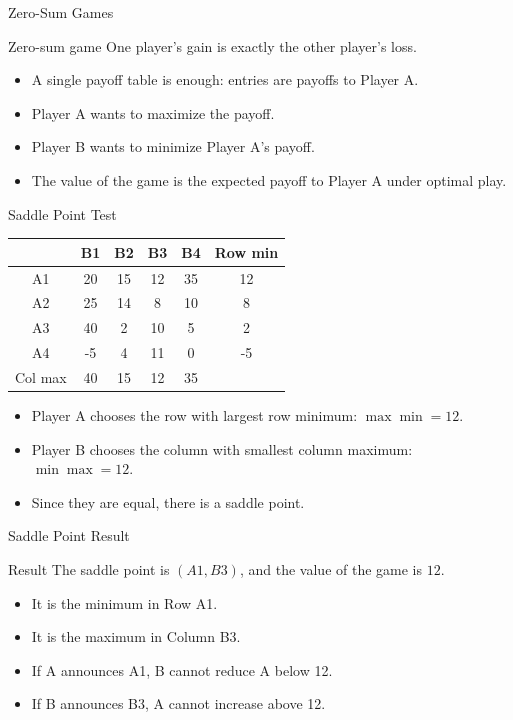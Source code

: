 \documentclass[10pt,aspectratio=169]{beamer}
\begin{document}
\begin{frame}{Zero-Sum Games}
\begin{block}{Zero-sum game}
One player's gain is exactly the other player's loss.
\end{block}
\vspace{0.2cm}
\begin{itemize}
  \item A single payoff table is enough: entries are payoffs to Player A.
  \item Player A wants to maximize the payoff.
  \item Player B wants to minimize Player A's payoff.
  \item The value of the game is the expected payoff to Player A under optimal play.
\end{itemize}
\end{frame}

\begin{frame}{Saddle Point Test}
\begin{center}
\begin{tabular}{c c c c c c}
 & B1 & B2 & B3 & B4 & Row min\\
\midrule
A1 & 20 & 15 & 12 & 35 & 12\\
A2 & 25 & 14 & 8 & 10 & 8\\
A3 & 40 & 2 & 10 & 5 & 2\\
A4 & -5 & 4 & 11 & 0 & -5\\
\midrule
Col max & 40 & 15 & 12 & 35 & \\
\end{tabular}
\end{center}
\vspace{0.2cm}
\begin{itemize}
  \item Player A chooses the row with largest row minimum: $\max \min = 12$.
  \item Player B chooses the column with smallest column maximum: $\min \max = 12$.
  \item Since they are equal, there is a saddle point.
\end{itemize}
\end{frame}

\begin{frame}{Saddle Point Result}
\begin{block}{Result}
The saddle point is $(A1,B3)$, and the value of the game is $12$.
\end{block}
\vspace{0.2cm}
\begin{itemize}
  \item It is the minimum in Row A1.
  \item It is the maximum in Column B3.
  \item If A announces A1, B cannot reduce A below 12.
  \item If B announces B3, A cannot increase above 12.
\end{itemize}
\end{frame}
\end{document}
